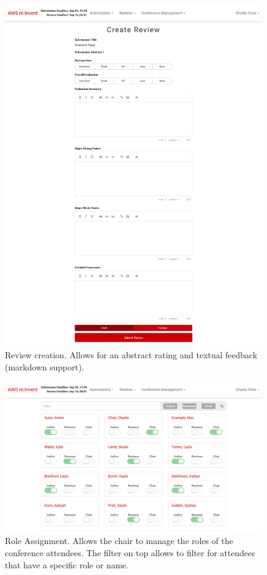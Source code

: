 \documentclass[nochapterpage,nopartpage,noheadingspace,numbersubsubsec,bigchapter,colorback,accentcolor=tud9c,10pt]{tudreport}
\begin{document}
        \begin{figure}[!ht]
            \centering
            \includegraphics[width=\textwidth]{img/ui-review-create}
            \caption{Review creation. Allows for an abstract rating and textual feedback (markdown support).}
            \label{fig:appendix:screenshots:ui-review-create}
        \end{figure}

        \begin{figure}[!ht]
            \centering
            \includegraphics[width=\textwidth]{img/ui-user-role-assignment}
            \caption{Role Assignment. Allows the chair to manage the roles of the conference attendees. The filter on top allows to filter for attendees that have a specific role or name.}
            \label{fig:appendix:screenshots:ui-user-role-assignment}
        \end{figure}
\end{document}
